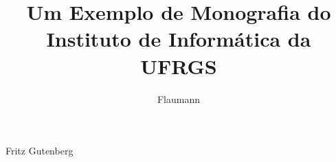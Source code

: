 \documentclass{iiufrgs}
\begin{document}
\usepackage[alf,abnt-emphasize=bf]{abntex2cite}	%

% 
% 
\title{Um Exemplo de Monografia do Instituto de Informática da UFRGS}

\author{Flaumann}{Fritz Gutenberg}








\end{document}
